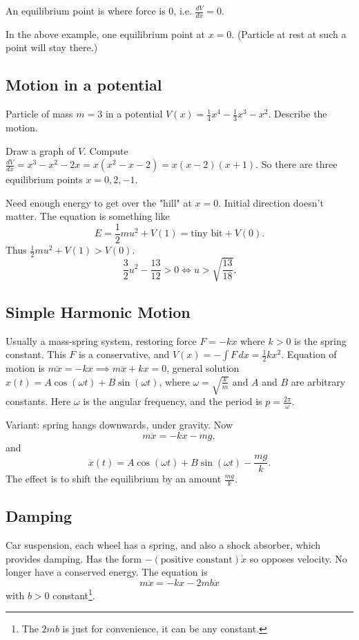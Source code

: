 \documentclass[10pt, a4paper]{article}
\begin{document}
\begin{definition}
    An equilibrium point is where force is $0$,
    i.e. $\frac{dV}{dx} = 0$.
\end{definition}

In the above example,
one equilibrium point at $x = 0$.
(Particle at rest at such a point will stay there.)

\subsection{Motion in a potential}

\begin{example}
    Particle of mass $m = 3$ in a potential $V(x) = \frac{1}{4}x ^ 4 - \frac{1}{3}x ^ 3 - x ^ 2$.
    Describe the motion.

    Draw a graph of $V$.
    Compute $\frac{dV}{dx} = x ^ 3 - x ^ 2 - 2x = x(x ^ 2 - x - 2) = x(x - 2)(x + 1)$.
    So there are three equilibrium points $x = 0, 2, -1$.

    Need enough energy to get over the "hill" at $x = 0$.
    Initial direction doesn't matter.
    The equation is something like
    \[
    E = \frac{1}{2}mu ^ 2 + V(1) = \text{tiny bit} + V(0).
    \]
    Thus $\frac{1}{2}mu ^ 2 + V(1) > V(0)$.
    \[
    \frac{3}{2}u ^ 2 - \frac{13}{12} > 0 \iff u > \sqrt{\frac{13}{18}}.
    \]
\end{example}

\subsection{Simple Harmonic Motion}
Usually a mass-spring system,
restoring force $F = -kx$ where $k > 0$ is the spring constant.
This $F$ is a conservative,
and $V(x) = -\int F\,dx = \frac{1}{2}kx ^ 2$.
Equation of motion is $m\ddot{x} = -kx \implies m\ddot{x} + kx = 0$,
general solution $x(t) = A\cos(\omega t) + B\sin(\omega t)$,
where $\omega = \sqrt{\frac{k}{m}}$ and $A$ and $B$ are arbitrary constants.
Here $\omega$ is the angular frequency,
and the period is $p = \frac{2\pi}{\omega}$.

Variant:
spring hangs downwards,
under gravity.
Now
\[
m\ddot{x} = -kx - mg,
\]
and
\[
x(t) = A\cos(\omega t) + B\sin(\omega t) - \frac{mg}{k}.
\]
The effect is to shift the equilibrium by an amount $\frac{mg}{k}$.

\subsection{Damping}
Car suspension,
each wheel has a spring,
and also a shock absorber,
which provides damping.
Has the form $-(\text{positive constant})\dot{x}$ so opposes velocity.
No longer have a conserved energy.
The equation is
\[
m\ddot{x} = -kx - 2mb\dot{x}
\]
with $b > 0$ constant\footnote{The $2mb$ is just for convenience,
it can be any constant.}.
\end{document}
